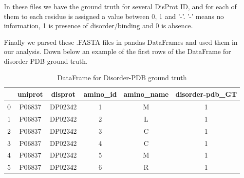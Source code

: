 In these files we have the ground truth for several DisProt ID, and for each of them to each residue is assigned a value between 0, 1 and '-'. '-' means no information, 1 is presence of disorder/binding and 0 is absence.

Finally we parsed these .FASTA files in pandas DataFrames and used them in our analysis. Down below an example of the first rows of the DataFrame for disorder-PDB ground truth.

\begin{table}[h!]
    \centering
    \begin{tabular}{c|c|c|c|c|c}
         & uniprot & disprot & \small amino\_id & amino\_name & disorder-pdb\_GT \normalsize \\
         \hline
        0 & P06837 & DP02342 & 1 & M & 1 \\
        1 & P06837 & DP02342 & 2 & L & 1 \\
        2 & P06837 & DP02342 & 3 & C & 1 \\
        3 & P06837 & DP02342 & 4 & C & 1 \\
        4 & P06837 & DP02342 & 5 & M & 1 \\
        5 & P06837 & DP02342 & 6 & R & 1 \\
    \end{tabular}
    \caption{DataFrame for Disorder-PDB ground truth}
\end{table}